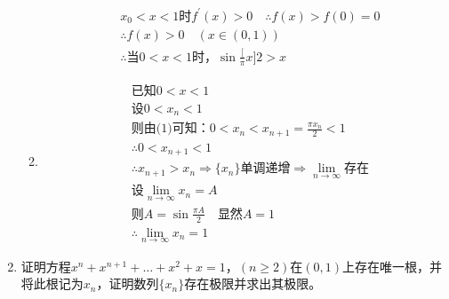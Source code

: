 \begin{enumerate}[{例}1.]
\begin{enumerate}[(1)]
\begin{align*}
                    &x_0<x<1\mbox{时}f^{\prime}(x)>0\quad\therefore f(x)>f(0)=0\\
                    &\therefore f(x)>0\quad(x\in(0,1))\\
                    &\therefore\mbox{当}0<x<1\mbox{时，}\sin\frac[\pi x]{2}>x
                \end{align*}
            \item
                \begin{align*}
                    &\mbox{已知}0<x<1\\
                    &\mbox{设}0<x_n<1\\
                    &\mbox{则由(1)可知：}0<x_n<x_{n+1}=\frac{\pi x_n}{2}<1\\
                    &\therefore 0<x_{n+1}<1\\
                    &\therefore x_{n+1}>x_n\Rightarrow\{x_n\}\mbox{单调递增}\Rightarrow\lim_{n\to\infty}\mbox{存在}\\
                    &\mbox{设}\lim_{n\to\infty}x_n=A\\
                    &\mbox{则}A=\sin\frac{\pi A}{2}\quad\mbox{显然}A=1\\
                    &\therefore\lim_{n\to\infty}x_n=1
                \end{align*}
        \end{enumerate}
    \item 证明方程$x^n+x^{n+1}+\dots+x^2+x=1$，$(n\geq 2)$在$(0,1)$上存在唯一根，并将此根记为$x_n$，证明数列$\{x_n\}$存在极限并求出其极限。


\end{enumerate}
